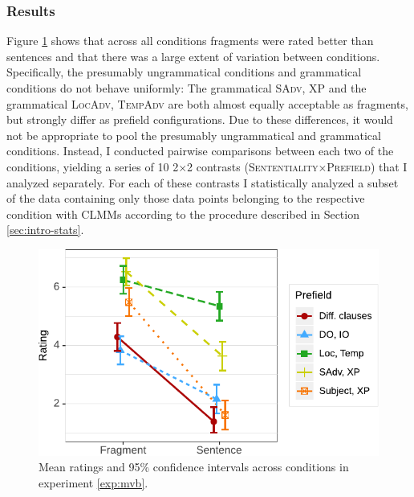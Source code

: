 \subsubsection{Results}\label{sec:mvb-results}
Figure \ref{fig:mvb-estimates} shows that across all conditions fragments were rated better than sentences and that there was a large extent of variation between conditions. Specifically, the presumably ungrammatical conditions and grammatical conditions do not behave uniformly: The grammatical \textsc{SAdv, XP} and the grammatical \textsc{LocAdv, TempAdv} are both almost equally acceptable as fragments, but strongly differ as prefield configurations. Due to these differences, it would not be appropriate to pool the presumably ungrammatical and grammatical conditions. Instead, I conducted pairwise comparisons between each two of the conditions, yielding a series of 10 2$\times$2 contrasts (\textsc{Sententiality}$\times$\textsc{Prefield}) that I analyzed separately. For each of these contrasts I statistically analyzed a subset of the data containing only those data points belonging to the respective condition with CLMMs according to the procedure described in Section \ref{sec:intro-stats}.

\begin{figure}
\includegraphics[scale=1]{figures/ex3_mvb_estimates}
 \caption{Mean ratings and 95\% confidence intervals across conditions in experiment \ref{exp:mvb}.\label{fig:mvb-estimates}}
\end{figure}

